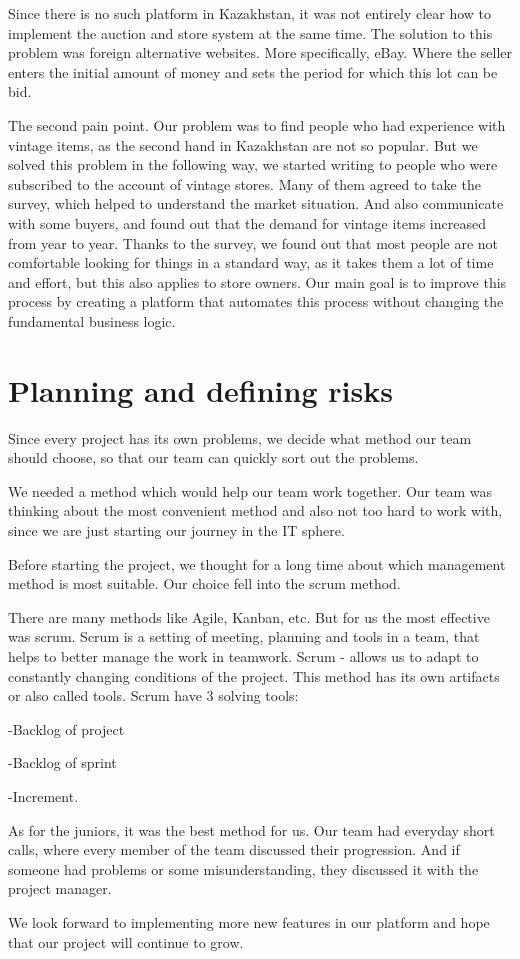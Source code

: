 Since there is no such platform in Kazakhstan, it was not entirely clear how to implement the auction and store system at the same time. 
The solution to this problem was foreign alternative websites. More specifically, eBay.
Where the seller enters the initial amount of money and sets the period for which this lot can be bid.

The second pain point. Our problem was to find people who had experience with vintage items, as the second hand in Kazakhstan are not so popular. But we solved this problem in the following way, we started writing to people who were subscribed to the account of vintage stores. Many of them agreed to take the survey, which helped to understand the market situation. And also communicate with some buyers, and found out that the demand for vintage items increased from year to year. Thanks to the survey, we found out that most people are not comfortable looking for things in a standard way, as it takes them a lot of time and effort, but this also applies to store owners. Our main goal is to improve this process by creating a platform that automates this process without changing the fundamental business logic.

\section{Planning and defining risks}
Since every project has its own problems, we decide what method our team should choose, so that our team can quickly sort out the problems. 

We needed a method which would help our team work together. Our team was thinking about the most convenient method and also not too hard to work with, since we are just starting our journey in the IT sphere.  

Before starting the project, we thought for a long time about which management method is most suitable. Our choice fell into the scrum method.

There are many methods like Agile, Kanban, etc. But for us the most effective was scrum. 
Scrum is a setting of meeting, planning and tools in a team, that helps to better manage the work in teamwork. 
Scrum - allows us to adapt to constantly changing conditions of the project.
This method has its own artifacts or also called tools.  
Scrum have 3 solving tools:

-Backlog of project

-Backlog of sprint

-Increment. 

As for the juniors, it was the best method for us. 
Our team had everyday short calls, where every member of the team discussed their progression. And if someone had problems or some misunderstanding, they 
discussed it with the project manager. 

We look forward to implementing more new features in our platform and hope that our project will continue to grow. 



